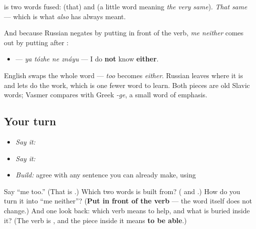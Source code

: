 \begin{cousinweb}
\textbf{} is two words fused: \textbf{} (that) and \textbf{} (a little word meaning \emph{the very same}). \emph{That same} — which is what \emph{also} has always meant.

And because Russian negates by putting \textbf{} in front of the verb, \emph{me neither} comes out by putting \textbf{} after \textbf{}:

\begin{itemize}
\raggedright
  \item \textbf{   } — \emph{ya tózhe ne znáyu} — I do \textbf{not} know \textbf{either}.
\end{itemize}

English swaps the whole word — \emph{too} becomes \emph{either}. Russian leaves \textbf{} where it is and lets \textbf{} do the work, which is one fewer word to learn. Both pieces are old Slavic words; Vasmer compares \textbf{} with Greek \emph{-ge}, a small word of emphasis.
\end{cousinweb}

\subsection*{Your turn}
\begin{itemize}
\raggedright
  \item \emph{Say it:} \emph{ }
  \item \emph{Say it:} \emph{   }
  \item \emph{Build:} agree with any sentence you can already make, using \textbf{}
\end{itemize}

\begin{tcolorbox}[breakable,colback=teal!4,colframe=teal!35!black,title={Before you move on}]
Say \textquotedblleft{}me too.\textquotedblright{} (That is \textbf{ }.) Which two words is \textbf{} built from? (\textbf{} and \textbf{}.) How do you turn it into \textquotedblleft{}me neither\textquotedblright{}? (\textbf{Put  in front of the verb} — the word \textbf{} itself does not change.) And one look back: which verb means to help, and what is buried inside it? (The verb is \textbf{}, and the piece inside it means \textbf{to be able}.)
\end{tcolorbox}
